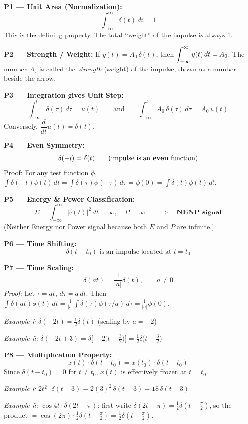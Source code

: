 \documentclass[10pt,a4paper]{article}
\newcommand{\Int}{\displaystyle\int_{-\infty}^{\infty}}
\newcommand{\Intt}{\displaystyle\int_{-\infty}^{t}}
\begin{document}
\begin{propbox}
\textbf{P1 --- Unit Area (Normalization):}
\[
  \Int \delta(t)\,dt = 1
\]
This is the defining property. The total ``weight'' of the impulse is always 1.

\medskip
\textbf{P2 --- Strength / Weight:}
If $y(t) = A_0\,\delta(t)$, then $\displaystyle\Int y(t)\,dt = A_0$.
The number $A_0$ is called the \emph{strength} (weight) of the impulse, shown as a number beside the arrow.

\medskip
\textbf{P3 --- Integration gives Unit Step:}
\[
  \Intt \delta(\tau)\,d\tau = u(t) \qquad \text{and} \qquad \Intt A_0\,\delta(\tau)\,d\tau = A_0\,u(t)
\]
Conversely, $\dfrac{d}{dt}u(t) = \delta(t)$.

\medskip
\textbf{P4 --- Even Symmetry:}
\[
  \delta(-t) = \delta(t) \qquad (\text{impulse is an \textbf{even} function})
\]
Proof: For any test function $\phi$, $\int \delta(-t)\phi(t)\,dt = \int \delta(\tau)\phi(-\tau)\,d\tau = \phi(0) = \int\delta(t)\phi(t)\,dt$.

\medskip
\textbf{P5 --- Energy \& Power Classification:}
\[
  E = \Int |\delta(t)|^2\,dt = \infty, \quad P = \infty \qquad \Rightarrow \quad \textbf{NENP signal}
\]
(Neither Energy nor Power signal because both $E$ and $P$ are infinite.)

\medskip
\textbf{P6 --- Time Shifting:}
\[
  \delta(t - t_0) \text{ is an impulse located at } t = t_0
\]

\medskip
\textbf{P7 --- Time Scaling:}
\[
  \delta(at) = \frac{1}{|a|}\delta(t), \qquad a \neq 0
\]
\textit{Proof:} Let $\tau = at$, $d\tau = a\,dt$. Then $\int\delta(at)\phi(t)\,dt = \frac{1}{|a|}\int\delta(\tau)\phi(\tau/a)\,d\tau = \frac{1}{|a|}\phi(0)$.

\quad\textit{Example i:} $\delta(-2t) = \tfrac{1}{2}\delta(t)$ \hfill (scaling by $a=-2$)

\quad\textit{Example ii:} $\delta(-2t+3) = \delta\bigl[-2\bigl(t-\tfrac{3}{2}\bigr)\bigr] = \tfrac{1}{2}\delta\bigl(t-\tfrac{3}{2}\bigr)$

\medskip
\textbf{P8 --- Multiplication Property:}
\[
  x(t)\cdot\delta(t - t_0) = x(t_0)\cdot\delta(t - t_0)
\]
Since $\delta(t-t_0)=0$ for $t\neq t_0$, $x(t)$ is effectively frozen at $t=t_0$.

\quad\textit{Example i:} $2t^2\cdot\delta(t-3) = 2(3)^2\,\delta(t-3) = 18\,\delta(t-3)$

\quad\textit{Example ii:} $\cos4t\cdot\delta(2t-\pi)$: first write $\delta(2t-\pi)=\tfrac{1}{2}\delta(t-\tfrac{\pi}{2})$, so the product $= \cos(2\pi)\cdot\tfrac{1}{2}\delta(t-\tfrac{\pi}{2}) = \tfrac{1}{2}\delta(t-\tfrac{\pi}{2})$.


\end{propbox}
\end{document}
